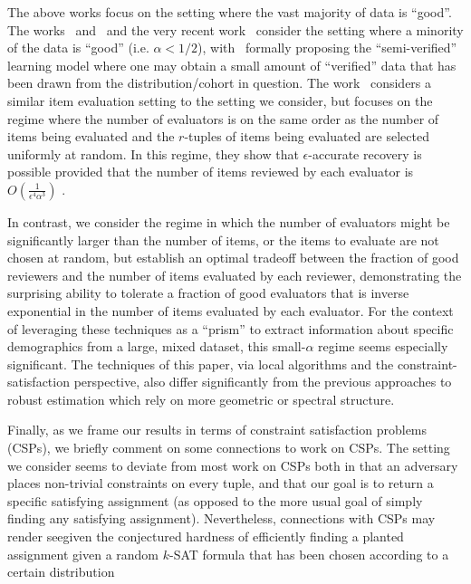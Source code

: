 \documentclass[anon,12pt]{colt2018}
\newcommand{\eps}{\epsilon}
\begin{document}
The above works focus on the setting where the vast majority of data is ``good''.  The works~\cite{steinhardt2016avoiding} and~\cite{CSV17} and the very recent work~\cite{diakonikolas2017list} consider the setting where a minority of the data is ``good'' (i.e. $\alpha < 1/2$), with~\cite{CSV17} formally proposing the ``semi-verified'' learning model where one may obtain a small amount of ``verified'' data that has been drawn from the distribution/cohort in question.  The work~\cite{steinhardt2016avoiding} considers a similar item evaluation setting to the setting we consider, but focuses on the regime where the number of evaluators is on the same order as the number of items being evaluated and the $r$-tuples of items being evaluated are selected uniformly at random.  In this regime, they show that $\eps$-accurate recovery is possible provided that the number of items reviewed by each evaluator is $O(\frac{1}{\eps^4\alpha^3})$ .  

In contrast, we consider the regime in which the number of evaluators might be significantly larger than the number of items, or the items to evaluate are not chosen at random, but establish an optimal tradeoff between the fraction of good reviewers and the number of items evaluated by each reviewer, demonstrating the surprising ability to tolerate a fraction of good evaluators that is inverse exponential in the number of items evaluated by each evaluator.   For the context of leveraging these techniques as a ``prism'' to extract information about specific demographics from a large, mixed dataset, this small-$\alpha$ regime seems especially significant.   The techniques of this paper, via local algorithms and the constraint-satisfaction perspective, also differ significantly from the previous approaches  to robust estimation which rely on more geometric or spectral structure.
  

\iffalse
Finally, as we frame our results in terms of constraint satisfaction problems (CSPs), we briefly comment on some connections to work on CSPs.   The setting we consider seems to deviate from most work on CSPs both in that an adversary places non-trivial constraints on every tuple, and that our goal is to return a specific satisfying assignment (as opposed to the more usual goal of simply finding any satisfying assignment).  Nevertheless, connections with CSPs may render  seegiven the conjectured hardness of efficiently finding a planted assignment given a random $k$-SAT formula that has been chosen according to a certain distribution  
\end{document}
